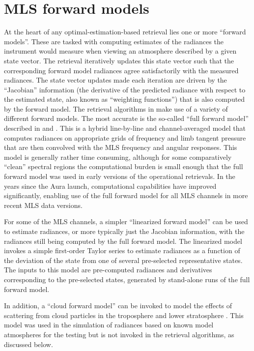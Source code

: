 \section{MLS forward models}

At the heart of any optimal-estimation-based retrieval lies one or more ``forward models''.  These are tasked with computing estimates of the radiances the instrument would measure when viewing an atmosphere described by a given state vector.  The retrieval iteratively updates this state vector such that the corresponding forward model radiances agree satisfactorily with the measured radiances.   The state vector updates made each iteration are driven by the ``Jacobian'' information (the derivative of the predicted radiance with respect to the estimated state, also known as ``weighting functions'') that is also computed by the forward model.  The retrieval algorithms in \thisv make use of a variety of different forward models. The most accurate is the so-called ``full forward model'' described in \citet{EOSMLSFWMATBD} and \citet{EOSMLSPolarizedFWMATBD}. This is a hybrid line-by-line and channel-averaged model that computes radiances on appropriate grids of frequency and limb tangent pressure that are then convolved with the MLS frequency and angular responses.  This model is generally rather time consuming, although for some comparatively ``clean'' spectral regions the computational burden is small enough that the full forward model was used in early versions of the operational retrievals. In the years since the Aura launch, computational capabilities have improved significantly, enabling use of the full forward model for all MLS channels in more recent MLS data versions.

For some of the MLS channels, a simpler ``linearized forward model'' can be used to estimate radiances, or more typically just the Jacobian information, with the radiances still being computed by the full forward model. The linearized model invokes a simple first-order Taylor series to estimate radiances as a function of the deviation of the state from one of several pre-selected representative states. The inputs to this model are pre-computed radiances and derivatives corresponding to the pre-selected states, generated by stand-alone runs of the full forward model.

In addition, a ``cloud forward model'' can be invoked to model the effects of scattering from cloud particles in the troposphere and lower stratosphere \citep{EOSMLSCloudATBD}. This model was used in the simulation of radiances based on known model atmospheres for the \thisv testing but is not invoked in the \thisv retrieval algorithms, as discussed below.

